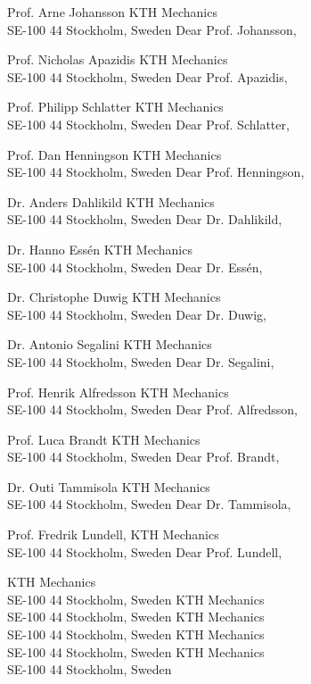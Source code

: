 %
%
%
%
Prof. Arne Johansson
KTH Mechanics\\SE-100 44 Stockholm, Sweden
Dear Prof. Johansson,

Prof. Nicholas Apazidis
KTH Mechanics\\SE-100 44 Stockholm, Sweden
Dear Prof. Apazidis,

Prof. Philipp Schlatter
KTH Mechanics\\SE-100 44 Stockholm, Sweden
Dear Prof. Schlatter,

Prof. Dan Henningson
KTH Mechanics\\SE-100 44 Stockholm, Sweden
Dear Prof. Henningson,

Dr. Anders Dahlikild
KTH Mechanics\\SE-100 44 Stockholm, Sweden
Dear Dr. Dahlikild,

Dr. Hanno Essén
KTH Mechanics\\SE-100 44 Stockholm, Sweden
Dear Dr. Essén,

Dr. Christophe Duwig
KTH Mechanics\\SE-100 44 Stockholm, Sweden
Dear Dr. Duwig,

Dr. Antonio Segalini
KTH Mechanics\\SE-100 44 Stockholm, Sweden
Dear Dr. Segalini,

Prof. Henrik Alfredsson
KTH Mechanics\\SE-100 44 Stockholm, Sweden
Dear Prof. Alfredsson,

Prof. Luca Brandt
KTH Mechanics\\SE-100 44 Stockholm, Sweden
Dear Prof. Brandt,

Dr. Outi Tammisola
KTH Mechanics\\SE-100 44 Stockholm, Sweden
Dear Dr. Tammisola,

Prof. Fredrik Lundell,
KTH Mechanics\\SE-100 44 Stockholm, Sweden
Dear Prof. Lundell,


KTH Mechanics\\SE-100 44 Stockholm, Sweden
KTH Mechanics\\SE-100 44 Stockholm, Sweden
KTH Mechanics\\SE-100 44 Stockholm, Sweden
KTH Mechanics\\SE-100 44 Stockholm, Sweden
KTH Mechanics\\SE-100 44 Stockholm, Sweden


